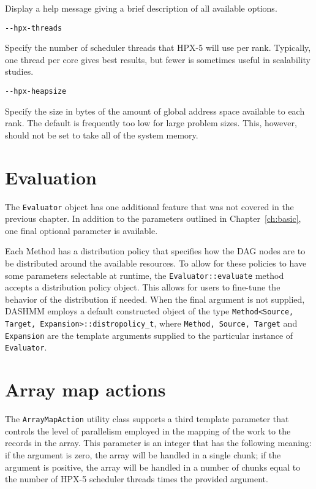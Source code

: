 Display a help message giving a brief description of all available options.

\begin{lstlisting}
--hpx-threads
\end{lstlisting}

Specify the number of scheduler threads that HPX-5 will use per rank.
Typically, one thread per core gives best results, but fewer is sometimes
useful in scalability studies.

\begin{lstlisting}
--hpx-heapsize
\end{lstlisting}


Specify the size in bytes of the amount of global address space available to
each rank. The default is frequently too low for large problem sizes. This,
however, should not be set to take all of the system memory.



\section{Evaluation}

The \texttt{Evaluator} object has one additional feature that was not
covered in the previous chapter. In addition to the parameters outlined
in Chapter~\ref{ch:basic}, one final optional parameter is available.

Each Method has a distribution policy that specifies how the DAG nodes are
to be distributed around the available resources. To allow for these policies
to have some parameters selectable at runtime, the
\texttt{Evaluator::evaluate} method accepts a distribution policy object.
This allows for users to fine-tune the behavior of the distribution if needed.
When the final argument is not supplied, DASHMM employs a default constructed
object of the type \texttt{Method<Source, Target, Expansion>::distropolicy\_t},
where \texttt{Method, Source, Target} and \texttt{Expansion} are the template
arguments supplied to the particular instance of \texttt{Evaluator}.



\section{Array map actions}

The \texttt{ArrayMapAction} utility class supports a third template parameter
that controls the level of parallelism employed in the mapping of the work
to the records in the array. This parameter is an integer that has the
following meaning: if the argument is zero, the array will be handled in a
single chunk; if the argument is positive, the array will be handled in a number
of chunks equal to the number of HPX-5 scheduler threads times the provided
argument.

